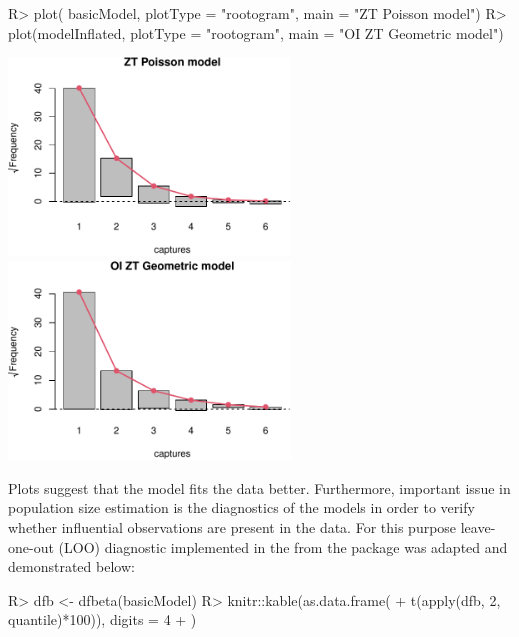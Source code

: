 \documentclass[
]{jss}
\newcommand{\1}{\mathcal{I}} \newcommand{\bZero}{\boldsymbol{0}}
\begin{document}
\begin{CodeChunk}
\begin{CodeInput}
R> plot(   basicModel, plotType = "rootogram", main = "ZT Poisson model")
R> plot(modelInflated, plotType = "rootogram", main = "OI ZT Geometric model")
\end{CodeInput}


\begin{center}\includegraphics[width=7.5cm]{singleRcapture_files/figure-latex/rootogram-1} \includegraphics[width=7.5cm]{singleRcapture_files/figure-latex/rootogram-2} \end{center}

\end{CodeChunk}

Plots suggest that the  model fits the data better.
Furthermore, important issue in population size estimation is the
diagnostics of the models in order to verify whether influential
observations are present in the data. For this purpose leave-one-out
(LOO) diagnostic implemented in the  from the 
package was adapted and demonstrated below:

\begin{CodeInput}
R> dfb <- dfbeta(basicModel)
R> knitr::kable(as.data.frame(
+   t(apply(dfb, 2, quantile)*100)), digits = 4
+ )
\end{CodeInput}
\end{document}
